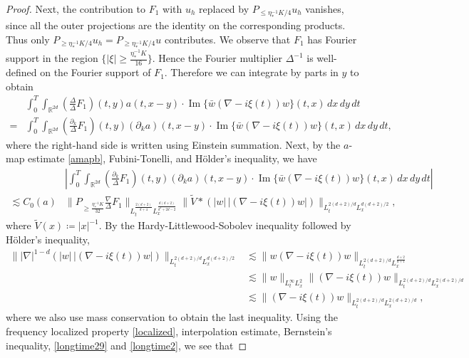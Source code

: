 \documentclass[reqno,11pt]{amsart}
\theoremstyle{plain}
\theoremstyle{definition}
\numberwithin{equation}{section}
\numberwithin{theorem}{section}
\def\geq{\geqslant}
\def\leq{\leqslant}
\begin{document}
\begin{proof}
 Next, the contribution to $F_1$ with $u_h$ replaced by
$P_{\leq\eta_{\ast}^{-1}K/4}u_h$ vanishes, since all the outer projections
are the identity on the corresponding products. Thus only
$P_{\geq\eta_{\ast}^{-1}K/4}u_h=P_{\geq\eta_{\ast}^{-1}K/4}u$
contributes. We observe that $F_{1}$ has Fourier support in the region $\{\vert \xi \vert \geq \frac{\eta_{\ast}^{-1}K}{16}\}$. Hence the Fourier multiplier $\Delta^{-1}$ is well-defined on the Fourier support of $F_{1}$. Therefore we can integrate by parts in $y$ to obtain
 \begin{align*}
&\int_{0}^{T }\int_{\mathbb{R}^{2d}}\left(\frac{\Delta}{\Delta}F_{1}\right)(t,y)a(t,x - y)\cdot \operatorname{Im}\{\bar{w} (\nabla -i\xi(t))w\} (t,x)\,dx\,dy\,dt \\
=& \int_{0}^{T }\int_{\mathbb{R}^{2d}}\left(\frac{\partial_{k}}{\Delta}F_{1}\right)(t,y)(\partial_{k}a)(t,x - y)\cdot \operatorname{Im}\{\bar{w} (\nabla -i\xi(t))w\} (t,x)\,dx\,dy\,dt, 
 \end{align*}
where the right-hand side is written using Einstein summation. Next, by the $a$-map estimate \eqref{amapb}, Fubini-Tonelli, and H\"older's inequality, we have
\begin{align*}
&\left|\int_{0}^{T}\int_{\mathbb{R}^{2d}}\left(\frac{\partial_{k}}{\Delta}F_{1}\right)(t,y)(\partial_{k}a)(t,x - y)\cdot \operatorname{Im}\{\bar{w} (\nabla -i\xi(t))w\} (t,x)\,dx\,dy\,dt\right| \\
\lesssim C_0(a)& \| P_{\geq \frac{\eta_{\ast}^{-1}K}{32}}\frac{\nabla}{\Delta}F_{1}\|_{L_{t}^{\frac{2(d+2)}{d+4}}L_{x}^{\frac{d(d+2)}{d^2+2d-2}}}\| \tilde{V} *(|w|\,|(\nabla -i\xi(t))w|)\|_{L_{t}^{2(d+2)/d}L_{x}^{d(d+2)/2}},
\end{align*}
where $\tilde{V}(x) \coloneqq |x|^{-1}$. By the Hardy-Littlewood-Sobolev inequality followed by H\"older's inequality,
\begin{align*}
    \||\nabla |^{1-d}(|w|\,|(\nabla -i\xi(t))w|)\|_{L_{t}^{2(d+2)/d}L_{x}^{d(d+2)/2}}
&\lesssim \| w(\nabla -i\xi(t))w\|_{L_{t}^{2(d+2)/d}L_{x}^{\frac{d+2}{d+1}}} \\
&\lesssim \| w\|_{L_{t}^{\infty}L_{x}^{2}}\| (\nabla -i\xi(t))w\|_{L_{t}^{2(d+2)/d}L_{x}^{2(d+2)/d}} \\
&\lesssim \| (\nabla -i\xi(t))w\|_{L_{t}^{2(d+2)/d}L_{x}^{2(d+2)/d}},
\end{align*}
where we also use mass conservation to obtain the last inequality. Using the frequency localized property \eqref{localized}, interpolation estimate, Bernstein's inequality, \eqref{longtime29} and \eqref{longtime2}, we see that

\end{proof}
\end{document}
